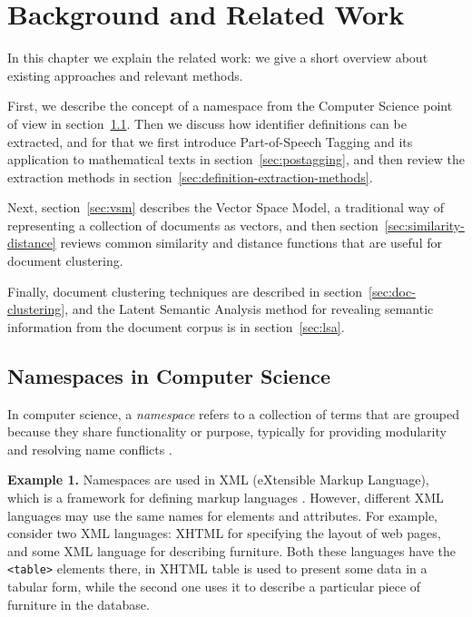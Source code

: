 \section{Background and Related Work} \label{sec:background}

In this chapter we explain the related work: we give a short overview 
about existing approaches and relevant methods. 

First, we describe the concept of a namespace from the Computer Science point
of view in section~\ref{sec:namespaces-cs}. Then we discuss how identifier 
definitions can be extracted, and for that we first introduce Part-of-Speech 
Tagging and its application to mathematical texts in section~\ref{sec:postagging},
and then review the extraction methods in section~\ref{sec:definition-extraction-methods}.

Next, section~\ref{sec:vsm}  describes the Vector Space Model, a traditional
way of representing a collection of documents as vectors, and then 
section~\ref{sec:similarity-distance} reviews common similarity and distance 
functions that are useful for document clustering. 

Finally, document clustering techniques are described in section~\ref{sec:doc-clustering},
and the Latent Semantic Analysis method for revealing semantic information from the 
document corpus is in section~\ref{sec:lsa}.


\subsection{Namespaces in Computer Science} \label{sec:namespaces-cs}

In computer science, a \emph{namespace} refers to a collection of terms
that are grouped because they share functionality or purpose,
typically for providing modularity
and resolving name conflicts \cite{duval2002metadata}.


\textbf{Example 1.} Namespaces are used in XML (eXtensible Markup Language), which
is a framework for defining markup languages \cite{moller2006introduction}.
However, different XML languages may use the same names for elements and attributes.
For example, consider two XML languages: XHTML for specifying the layout of web
pages, and some XML language for describing furniture. Both these languages have
the \verb|<table>| elements there, in XHTML table is used to present some data in
a tabular form, while the second one uses it to describe a particular piece of
furniture in the database.

